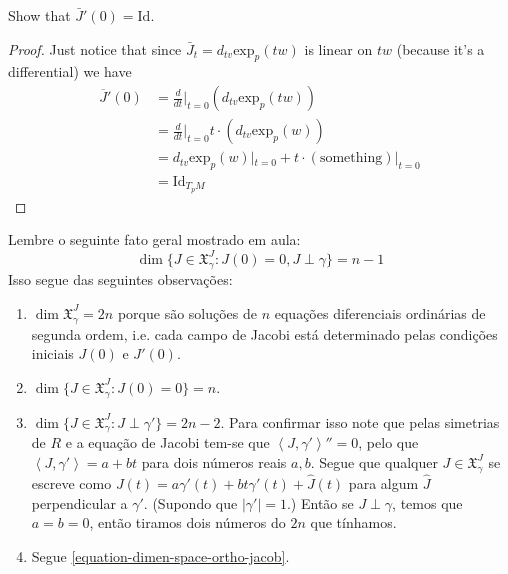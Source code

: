 \begin{exercise}
\label{exercise-Jacobi-tensor-derivative}
Show that $\bar{J}'(0)=\text{Id}$.
\end{exercise}

\begin{proof}
Just notice that since
$\bar{J}_t=d_{tv}\text{exp}_p(tw)$ is linear
on
$tw$ (because it's a differential) we have
$$
\begin{aligned}
\overline{J}'(0)&=\frac{d}{dt}\Big|_{t=0}
(d_{tv}\text{exp}_p(tw))\\
&=\frac{d}{dt}\Big|_{t=0}t\cdot
(d_{tv}\text{exp}_p(w))\\
&=d_{tv}\text{exp}_p(w)|_{t=0}+
t\cdot(\text{something})|_{t=0}\\
&=\text{Id}_{T_pM}
\end{aligned}
$$
\end{proof}

\begin{remark}
\label{remark-dimen-space-jacob-field}
Lembre o seguinte fato geral mostrado em
aula:
\begin{equation}
\label{equation-dimen-space-ortho-jacob}
\dim\{J \in \mathfrak{X}^J_\gamma:J(0)=0, J
\perp \gamma\}=n-1
\end{equation}
Isso segue das seguintes observações:
\begin{enumerate}
\item $\dim\mathfrak{X}^J_\gamma=2n$ porque
são soluções de $n$ equações
diferenciais ordinárias de segunda ordem,
i.e. cada campo de Jacobi está
determinado pelas condições iniciais $J(0)$ e
$J'(0)$.
\item $\dim \{J \in
\mathfrak{X}^J_\gamma:J(0)=0\}=n$.
\item $\dim \{J \in
\mathfrak{X}^J_\gamma:J\perp \gamma'\}=2n-2$.
Para
confirmar isso note que pelas simetrias de
$R$ e a equação de Jacobi tem-se
que $\left\langle{}J,\gamma'\right\rangle{}''=0$, pelo que
$\left\langle{}J,\gamma'\right\rangle{}=a+bt$
para dois números reais $a,b$. Segue que
qualquer $J \in
\mathfrak{X}^J_\gamma$ se escreve como
$J(t)=a\gamma'(t)+bt\gamma'(t)+\hat{J}(t)$
para algum $\hat{J}$
perpendicular a  $\gamma'$. (Supondo que
$|\gamma'|=1$.) Então se $J \perp
\gamma$, temos que  $a=b=0$, então tiramos
dois números do $2n$ que
tínhamos.
\item Segue
\ref{equation-dimen-space-ortho-jacob}.
\end{enumerate}

\end{remark}


